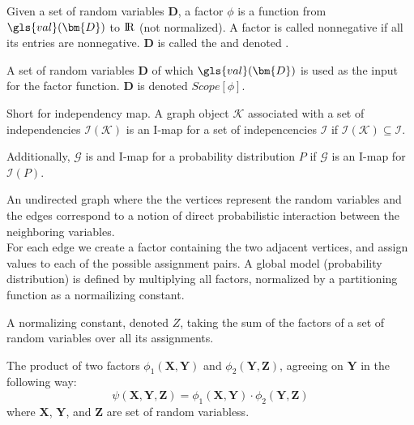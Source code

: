 
{%
  Given a \gls{set of random variables} $\bm{D}$, a factor $\phi$ is a function from $\gls{val}(\bm{D})$ to ${\rm I\!R}$ (not normalized). A factor is called nonnegative if all its entries are nonnegative. $\bm{D}$ is called the  and denoted .
}

{%
  A \gls{set of random variables} $\bm{D}$ of which $\gls{val}(\bm{D})$ is used as the input for the \gls{factor} function. $\bm{D}$ is denoted $Scope[\phi]$.
}

{%
  Short for independency map. A graph object $\mathcal{K}$ associated with a \gls{set of independencies} $\mathcal{I}(\mathcal{K})$ is an I-map for a set of indepencencies $\mathcal{I}$ if $\mathcal{I}(\mathcal{K})\subseteq\mathcal{I}$.

  Additionally, $\mathcal{G}$ is and I-map for a \gls{probability distribution} $P$ if $\mathcal{G}$ is an I-map for $\mathcal{I}(P)$.

}

{%
  An undirected graph where the the vertices represent the \glspl{random variable} and the edges correspond to a notion of direct probabilistic interaction between the neighboring variables.\\

  For each edge we create a \gls{factor} containing the two adjacent vertices, and assign values to each of the possible assignment pairs. A global model (probability distribution) is defined by multiplying all factors, normalized by a \gls{partitioning function} as a normailizing constant.

}

{%
  A normalizing constant, denoted $Z$, taking the sum of the \glspl{factor} of a \gls{set of random variables} over all its assignments.
}

{%
  The product of two \glspl{factor} $\phi_1(\bm{X},\bm{Y})$ and $\phi_2(\bm{Y},\bm{Z})$, agreeing on $\bm{Y}$ in the following way:
  \begin{equation*}
    \psi(\bm{X},\bm{Y},\bm{Z})=\phi_1(\bm{X},\bm{Y})\cdot\phi_2(\bm{Y},\bm{Z})
  \end{equation*}
  where $\bm{X}$, $\bm{Y}$, and $\bm{Z}$ are \glspl{set of random variables}.
}

